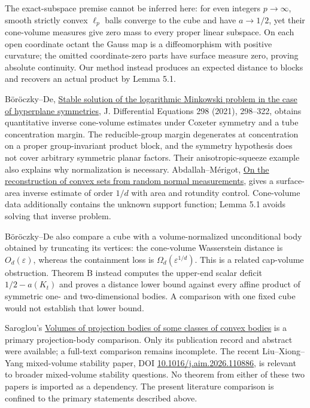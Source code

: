 \documentclass[
  11pt,
]{article}
\begin{document}
The exact-subspace premise cannot be inferred here: for even integers
\(p\to\infty\), smooth strictly convex \(\ell_p\) balls converge to the
cube and have \(a\to1/2\), yet their cone-volume measures give zero mass
to every proper linear subspace. On each open coordinate octant the
Gauss map is a diffeomorphism with positive curvature; the omitted
coordinate-zero parts have surface measure zero, proving absolute
continuity. Our method instead produces an expected distance to blocks
and recovers an actual product by Lemma 5.1.

Böröczky--De, \href{https://arxiv.org/abs/2101.03395}{Stable solution of
the logarithmic Minkowski problem in the case of hyperplane symmetries},
J. Differential Equations 298 (2021), 298--322, obtains quantitative
inverse cone-volume estimates under Coxeter symmetry and a tube
concentration margin. The reducible-group margin degenerates at
concentration on a proper group-invariant product block, and the
symmetry hypothesis does not cover arbitrary symmetric planar factors.
Their anisotropic-squeeze example also explains why normalization is
necessary. Abdallah--Mérigot, \href{https://arxiv.org/abs/1402.5010}{On
the reconstruction of convex sets from random normal measurements},
gives a surface-area inverse estimate of order \(1/d\) with area and
rotundity control. Cone-volume data additionally contains the unknown
support function; Lemma 5.1 avoids solving that inverse problem.

Böröczky--De also compare a cube with a volume-normalized unconditional
body obtained by truncating its vertices: the cone-volume Wasserstein
distance is \(O_d(\varepsilon)\), whereas the containment loss is
\(\Omega_d(\varepsilon^{1/d})\). This is a related cap-volume
obstruction. Theorem B instead computes the upper-end scalar deficit
\(1/2-a(K_t)\) and proves a distance lower bound against every affine
product of symmetric one- and two-dimensional bodies. A comparison with
one fixed cube would not establish that lower bound.

Saroglou's \href{https://doi.org/10.1112/S0025579311001860}{Volumes of
projection bodies of some classes of convex bodies} is a primary
projection-body comparison. Only its publication record and abstract
were available; a full-text comparison remains incomplete. The recent
Liu--Xiong--Yang mixed-volume stability paper, DOI
\href{https://doi.org/10.1016/j.aim.2026.110886}{10.1016/j.aim.2026.110886},
is relevant to broader mixed-volume stability questions. No theorem from
either of these two papers is imported as a dependency. The present
literature comparison is confined to the primary statements described
above.
\end{document}
